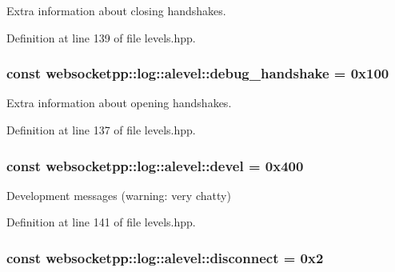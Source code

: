 Extra information about closing handshakes. 



Definition at line 139 of file levels.\+hpp.

\hypertarget{structwebsocketpp_1_1log_1_1alevel_a5756fbbc77e431534a43072f944283fc}{}
\subsubsection[{debug\+\_\+handshake}]{ const websocketpp\+::log\+::alevel\+::debug\+\_\+handshake = 0x100\hspace{0.3cm}{\ttfamily [static]}}\label{structwebsocketpp_1_1log_1_1alevel_a5756fbbc77e431534a43072f944283fc}


Extra information about opening handshakes. 



Definition at line 137 of file levels.\+hpp.

\hypertarget{structwebsocketpp_1_1log_1_1alevel_a65ec21c75999c993c25c72569018f576}{}
\subsubsection[{devel}]{ const websocketpp\+::log\+::alevel\+::devel = 0x400\hspace{0.3cm}{\ttfamily [static]}}\label{structwebsocketpp_1_1log_1_1alevel_a65ec21c75999c993c25c72569018f576}


Development messages (warning\+: very chatty) 



Definition at line 141 of file levels.\+hpp.

\hypertarget{structwebsocketpp_1_1log_1_1alevel_af19681d3edb28e0407688eeda8f0005c}{}
\subsubsection[{disconnect}]{ const websocketpp\+::log\+::alevel\+::disconnect = 0x2\hspace{0.3cm}{\ttfamily [static]}}\label{structwebsocketpp_1_1log_1_1alevel_af19681d3edb28e0407688eeda8f0005c}


